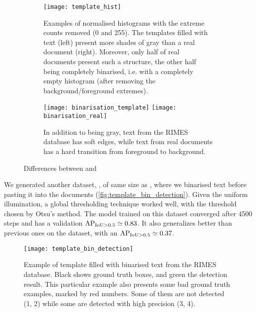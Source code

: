 		\begin{figure}
			\begin{subfigure}{\linewidth}
				\texttt{[image: template\_hist]}
				\caption[Template histograms]{
					Examples of normalised histograms with the extreme counts removed (0 and 255). The templates filled with text (left) present more shades of gray than a real document (right).  Moreover, only half of real documents present such a structure, the other half being completely binarised, i.e. with a completely empty histogram (after removing the background/foreground extremes).
				}
				\label{fig:template_gray_hist}
			\end{subfigure}
			\begin{subfigure}{\linewidth}
				\texttt{[image: binarisation\_template]}
				\texttt{[image: binarisation\_real]}
				\caption{In addition to being gray, text from the RIMES database has soft edges, while text from real documents has a hard transition from foreground to background.}
				\label{fig:template_gray_example}
			\end{subfigure}
			\caption{Differences between  and }
			\label{fig:template_gray}
		\end{figure}

		We generated another dataset, , of same size as , where we binarised text before pasting it into the documents (\autoref{fig:template_bin_detection}). Given the uniform illumination, a global thresholding technique worked well, with the threshold chosen by Otsu's method. The model trained on this dataset converged after 4500 steps and has a validation \(\operatorname{\operatorname{AP}_{\operatorname{IoU} > 0.5}} \simeq 0.83 \). It also generalizes better than previous ones on the  dataset, with an \(\operatorname{\operatorname{AP}_{\operatorname{IoU} > 0.5}} \simeq 0.37\).

		\begin{figure}
			\texttt{[image: template\_bin\_detection]}
			\caption[ example]{Example of template filled with binarised text from the RIMES database. Black shows ground truth boxes, and green the detection result. This particular example also presents some bad ground truth examples, marked by red numbers. Some of them are not detected (1, 2) while some are detected with high precision (3, 4). }
			\label{fig:template_bin_detection}
		\end{figure}



